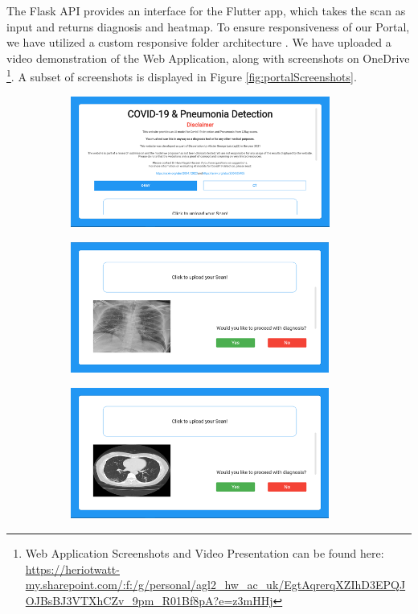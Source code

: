 The Flask API provides an interface for the Flutter app, which takes the scan as input and returns diagnosis and heatmap. To ensure responsiveness of our Portal, we have utilized a custom responsive folder architecture \cite{agl2020}. We have uploaded a video demonstration of the Web Application, along with screenshots on OneDrive \footnote{Web Application Screenshots and Video Presentation can be found here: \url{https://heriotwatt-my.sharepoint.com/:f:/g/personal/agl2_hw_ac_uk/EgtAqrerqXZIhD3EPQJOJBsBJ3VTXhCZv_9pm_R01Bf8pA?e=z3mHHj}}. A subset of screenshots is displayed in Figure \ref{fig:portalScreenshots}.

\begin{figure}[H]
        \begin{subfigure}[b]{0.5\textwidth}
                \includegraphics[width=\linewidth, height=4.3cm]{Images/Website Screenshot 1.png}
        \end{subfigure}%
        \begin{subfigure}[b]{0.5\textwidth}
                \includegraphics[width=\linewidth, height=4.3cm]{Images/Website Screenshot 5.png}
        \end{subfigure}%
        \vspace{0.8em}
        \begin{subfigure}[b]{0.5\textwidth}
                \includegraphics[width=\linewidth, height=4.3cm]{Images/Website Screenshot 7.png}

\end{subfigure}
\end{figure}
